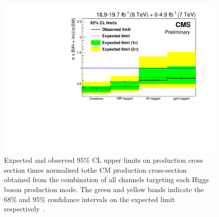 \begin{figure}
  \includegraphics[width=\largefigwidth]{plots/comb/HIG-15-012-figs/channellimit.pdf}
  \caption{Expected and observed 95\% \ac{CL} upper limits on production cross section times \BRinv normalised tothe \ac{CM} production cross-section obtained from the combination of all channels targeting each Higgs boson production mode. The green and yellow bands indicate the 68\% and 95\% confidance intervals on the expected limit respectively~\cite{CMS-PAS-HIG-15-012}.}
  \label{fig:parkedcombchannel}
\end{figure}

